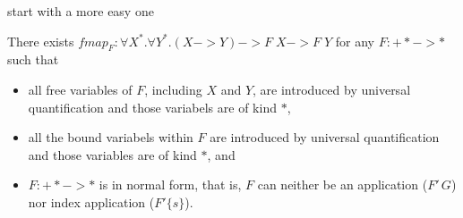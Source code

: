 start with a more easy one
\begin{proposition}
There exists
$\textit{fmap}_F : \forall X^{*}.\forall Y^{*}.(X -> Y) -> F\;X -> F\;Y$
for any $F : +* -> *$ such that
\begin{itemize}
	\item all free variables of $F$, including $X$ and $Y$,
		are introduced by universal quantification
		and those variabels are of kind $*$,
	\item all the bound variabels within $F$ are
		introduced by universal quantification
		and those variables are of kind $*$, and
	\item $F : +* -> *$ is in normal form, that is, $F$ can neither be
		an application ($F'\,G$) nor index application ($F'\{s\}$).
\end{itemize}
\end{proposition}
